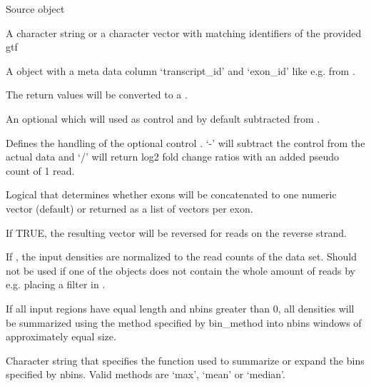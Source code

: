 \documentclass[letterpaper]{book}
\begin{document}
\begin{Arguments}
\begin{ldescription}
\item[\code{dc}] 
Source  object

\item[\code{tname}, \code{tnames}] 
A character string or a character vector with matching identifiers of the provided gtf

\item[\code{gtf}] 
A  object with a meta data column `transcript\_id' and `exon\_id' like e.g. from . 

\item[\code{toRle}] 
The return values will be converted to a . 

\item[\code{control}] 
An optional  which will used as control and by default subtracted from .

\item[\code{input\_method}] 
Defines the handling of the optional control . `-' will subtract the control from the actual data and `/' will return log2 fold change ratios with an added pseudo count of 1 read.

\item[\code{concatenate}] 
Logical that determines whether exons will be concatenated to one numeric vector (default) or returned as a list of vectors per exon.

\item[\code{stranded}] 
If TRUE, the resulting vector will be reversed for reads on the reverse strand.

\item[\code{treads\_norm}] 
If , the input densities are normalized to the read counts of the data set. Should not be used if one of the  objects does not contain the whole amount of reads by e.g. placing a filter in . 

\item[\code{nbins}] 
If all input regions have equal length and nbins greater than 0, all densities will be summarized using the method specified by bin\_method into nbins windows of approximately equal size. 

\item[\code{bin\_method}] 
Character string that specifies the function used to summarize or expand the bins specified by nbins. Valid methods are `max', `mean' or `median'.

\end{ldescription}
\end{Arguments}
\end{document}
